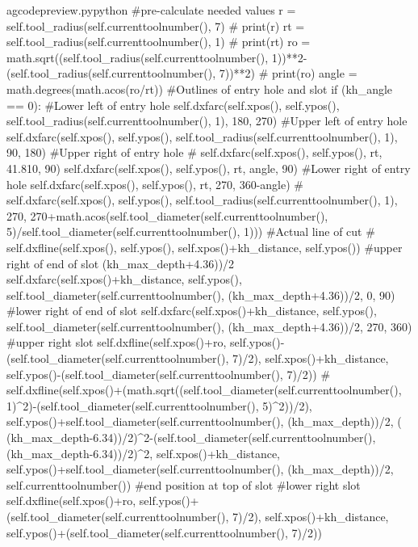 \documentclass{ltxdoc}
\begin{document}
\lstset{firstnumber=\thegcpy}
\begin{writecode}{a}{gcodepreview.py}{python}
#pre-calculate needed values
        r = self.tool_radius(self.currenttoolnumber(), 7)
#        print(r)
        rt = self.tool_radius(self.currenttoolnumber(), 1)
#        print(rt)
        ro = math.sqrt((self.tool_radius(self.currenttoolnumber(), 1))**2-(self.tool_radius(self.currenttoolnumber(), 7))**2)
#        print(ro)
        angle = math.degrees(math.acos(ro/rt))
#Outlines of entry hole and slot
        if (kh_angle == 0):
#Lower left of entry hole
            self.dxfarc(self.xpos(), self.ypos(), self.tool_radius(self.currenttoolnumber(), 1), 180, 270)
#Upper left of entry hole
            self.dxfarc(self.xpos(), self.ypos(), self.tool_radius(self.currenttoolnumber(), 1), 90, 180)
#Upper right of entry hole
#            self.dxfarc(self.xpos(), self.ypos(), rt, 41.810, 90)
            self.dxfarc(self.xpos(), self.ypos(), rt, angle, 90)
#Lower right of entry hole
            self.dxfarc(self.xpos(), self.ypos(), rt, 270, 360-angle)
#            self.dxfarc(self.xpos(), self.ypos(), self.tool_radius(self.currenttoolnumber(), 1), 270, 270+math.acos(self.tool_diameter(self.currenttoolnumber(), 5)/self.tool_diameter(self.currenttoolnumber(), 1)))
#Actual line of cut
#            self.dxfline(self.xpos(), self.ypos(), self.xpos()+kh_distance, self.ypos())
#upper right of end of slot (kh_max_depth+4.36))/2
            self.dxfarc(self.xpos()+kh_distance, self.ypos(), self.tool_diameter(self.currenttoolnumber(), (kh_max_depth+4.36))/2, 0, 90)
#lower right of end of slot
            self.dxfarc(self.xpos()+kh_distance, self.ypos(), self.tool_diameter(self.currenttoolnumber(), (kh_max_depth+4.36))/2, 270, 360)
#upper right slot
            self.dxfline(self.xpos()+ro, self.ypos()-(self.tool_diameter(self.currenttoolnumber(), 7)/2), self.xpos()+kh_distance, self.ypos()-(self.tool_diameter(self.currenttoolnumber(), 7)/2))
#            self.dxfline(self.xpos()+(math.sqrt((self.tool_diameter(self.currenttoolnumber(), 1)^2)-(self.tool_diameter(self.currenttoolnumber(), 5)^2))/2), self.ypos()+self.tool_diameter(self.currenttoolnumber(), (kh_max_depth))/2, ( (kh_max_depth-6.34))/2)^2-(self.tool_diameter(self.currenttoolnumber(), (kh_max_depth-6.34))/2)^2, self.xpos()+kh_distance, self.ypos()+self.tool_diameter(self.currenttoolnumber(), (kh_max_depth))/2, self.currenttoolnumber())
#end position at top of slot
#lower right slot
            self.dxfline(self.xpos()+ro, self.ypos()+(self.tool_diameter(self.currenttoolnumber(), 7)/2), self.xpos()+kh_distance, self.ypos()+(self.tool_diameter(self.currenttoolnumber(), 7)/2))

\end{writecode}
\end{document}
